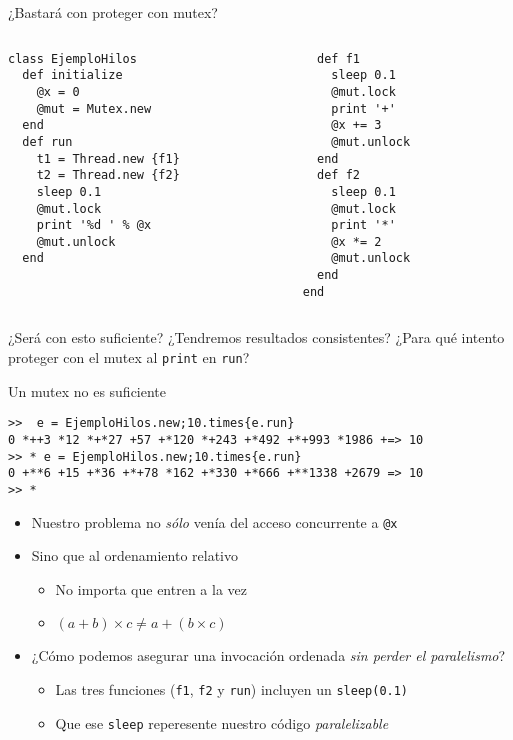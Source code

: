 \documentclass[presentation]{beamer}
\begin{document}
\begin{frame}[label={sec:orga2274f6},fragile]{¿Bastará con proteger con mutex?}
 \begin{columns}\begin{column}{0.5\textwidth}
\begin{verbatim}
class EjemploHilos
  def initialize
    @x = 0
    @mut = Mutex.new
  end
  def run
    t1 = Thread.new {f1}
    t2 = Thread.new {f2}
    sleep 0.1
    @mut.lock
    print '%d ' % @x
    @mut.unlock
  end
\end{verbatim}
\end{column} \begin{column}{0.5\textwidth}
\begin{verbatim}
  def f1
    sleep 0.1
    @mut.lock
    print '+'
    @x += 3
    @mut.unlock
  end
  def f2
    sleep 0.1
    @mut.lock
    print '*'
    @x *= 2
    @mut.unlock
  end
end
\end{verbatim}
\end{column}\end{columns}
\begin{center}
¿Será con esto suficiente?
¿Tendremos resultados consistentes?
¿Para qué intento proteger con el mutex al \texttt{print} en \texttt{run}?
\end{center}
\end{frame}

\begin{frame}[label={sec:org75e4c46},fragile]{Un mutex no es suficiente}
 \begin{verbatim}
>>  e = EjemploHilos.new;10.times{e.run}
0 *++3 *12 *+*27 +57 +*120 *+243 +*492 +*+993 *1986 +=> 10
>> * e = EjemploHilos.new;10.times{e.run}
0 +**6 +15 +*36 +*+78 *162 +*330 +*666 +**1338 +2679 => 10
>> *
\end{verbatim}
\begin{itemize}
\item Nuestro problema no \emph{sólo} venía del acceso concurrente a \texttt{@x}
\item Sino que al ordenamiento relativo
\begin{itemize}
\item No importa que entren a la vez
\item \((a + b) \times c \ne a + (b \times c)\)
\end{itemize}
\item ¿Cómo podemos asegurar una invocación ordenada \emph{sin perder el paralelismo}?
\begin{itemize}
\item Las tres funciones (\texttt{f1}, \texttt{f2} y \texttt{run}) incluyen un \texttt{sleep(0.1)}
\item Que ese \texttt{sleep} reperesente nuestro código \emph{paralelizable}
\end{itemize}
\end{itemize}
\end{frame}
\end{document}
